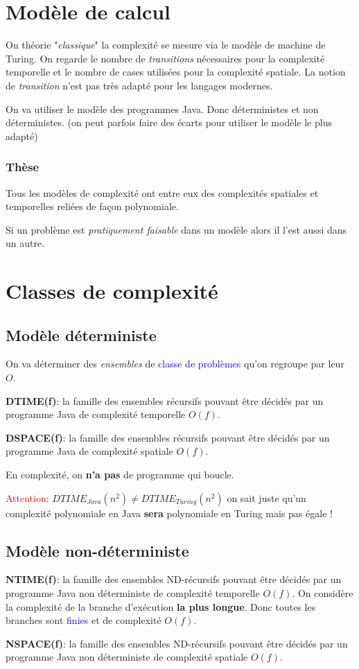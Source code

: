 \documentclass{report}
\begin{document}
\section{Modèle de calcul}
On théorie "\textit{classique}" la complexité se mesure via le modèle de machine de Turing. On regarde le nombre de \textit{transitions} nécessaires pour la complexité temporelle et le nombre de cases utilisées pour la complexité spatiale. La notion de \textit{transition} n'est pas très adapté pour les langages modernes.\par
On va utiliser le modèle des programmes Java. Donc déterministes et non déterministes. (on peut parfois faire des écarts pour utiliser le modèle le plus adapté)
\subsubsection{Thèse}
Tous les modèles de complexité ont entre eux des complexités spatiales et temporelles reliées de façon polynomiale.\par
Si un problème est \textit{pratiquement faisable} dans un modèle alors il l'est aussi dans un autre.

\section{Classes de complexité}
\subsection{Modèle déterministe}
On va déterminer des \textit{ensembles} de \textcolor{blue}{classe de problèmes} qu'on regroupe par leur $O$.\par
\textbf{DTIME(f)}: la famille des ensembles récursifs pouvant être décidés par un programme Java de complexité temporelle $O(f)$.\par 
\textbf{DSPACE(f)}: la famille des ensembles récursifs pouvant être décidés par un programme Java de complexité spatiale $O(f)$.\par
En complexité, on \textbf{n'a pas} de programme qui boucle.\par
\textcolor{red}{Attention}: $DTIME_{Java}(n^2) \neq DTIME_{Turing}(n^2)$ on sait juste qu'un complexité polynomiale en Java \textbf{sera} polynomiale en Turing mais pas égale !

\subsection{Modèle non-déterministe}
\textbf{NTIME(f)}: la famille des ensembles ND-récursifs pouvant être décidés par un programme Java non déterministe de complexité temporelle $O(f)$. On considère la complexité de la branche d'exécution \textbf{la plus longue}. Donc toutes les branches sont \textcolor{blue}{finies} et de complexité $O(f)$.\par
\textbf{NSPACE(f)}: la famille des ensembles ND-récursifs pouvant être décidés par un programme Java non déterministe de complexité spatiale $O(f)$.
\end{document}
